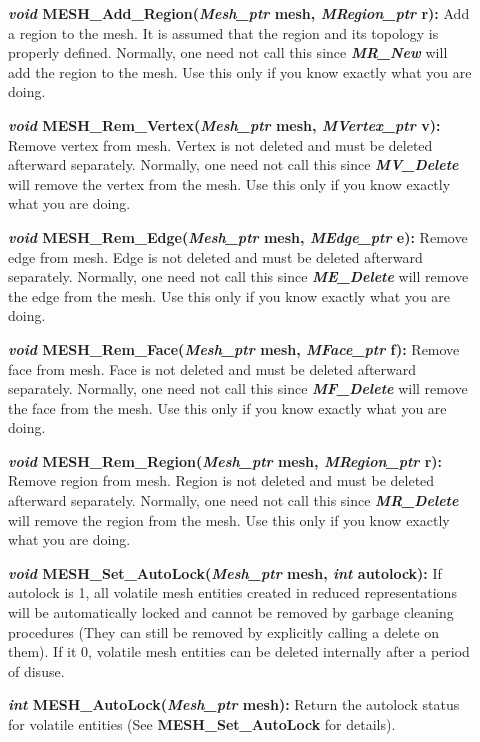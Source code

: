 \documentclass[12pt]{article}
\begin{document}
\begin{description}
\item[]{\bf {\em void} MESH\_Add\_Region({\em Mesh\_ptr}
    mesh, {\em MRegion\_ptr} r):} Add a region to the mesh. It is
  assumed that the region and its topology is properly defined.
  Normally, one need not call this since {\bf {\em MR\_New}}
  will add the region to the mesh. Use this only if you know exactly
  what you are doing.

\item[]{\bf {\em void} MESH\_Rem\_Vertex({\em Mesh\_ptr}
    mesh, {\em MVertex\_ptr} v):} Remove vertex from mesh. Vertex
  is not deleted and must be deleted afterward separately. Normally,
  one need not call this since {\bf {\em MV\_Delete}} will
  remove the vertex from the mesh. Use this only if you know exactly
  what you are doing.

\item[]{\bf {\em void} MESH\_Rem\_Edge({\em Mesh\_ptr} mesh,
    {\em MEdge\_ptr} e):} Remove edge from mesh. Edge is not
  deleted and must be deleted afterward separately. Normally, one need
  not call this since {\bf {\em ME\_Delete}} will remove the
  edge from the mesh. Use this only if you know exactly what you are
  doing.
  
\item[]{\bf {\em void} MESH\_Rem\_Face({\em Mesh\_ptr} mesh,
    {\em MFace\_ptr} f):} Remove face from mesh. Face is not
  deleted and must be deleted afterward separately. Normally, one need
  not call this since {\bf {\em MF\_Delete}} will remove the
  face from the mesh. Use this only if you know exactly what you are
  doing.
  
\item[]{\bf {\em void} MESH\_Rem\_Region({\em Mesh\_ptr}
    mesh, {\em MRegion\_ptr} r):} Remove region from mesh. Region
  is not deleted and must be deleted afterward separately. Normally,
  one need not call this since {\bf {\em MR\_Delete}} will
  remove the region from the mesh. Use this only if you know exactly
  what you are doing.


\item[]{\bf {\em void} MESH\_Set\_AutoLock({\em Mesh\_ptr} mesh, {\em
      int} autolock):} If autolock is 1, all volatile mesh entities
  created in reduced representations will be automatically locked and
  cannot be removed by garbage cleaning procedures (They can still be
  removed by explicitly calling a delete on them). If it 0, volatile
  mesh entities can be deleted internally after a period of disuse.

\item[]{\bf {\em int} MESH\_AutoLock({\em Mesh\_ptr} mesh):} Return
the autolock status for volatile entities (See {\bf
  MESH\_Set\_AutoLock} for details).

\end{description}
\end{document}
